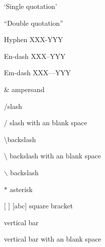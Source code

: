 \documentclass[12pt]{article}
\begin{document}
`Single quotation'

``Double quotation''

Hyphen XXX-YYY

En-dash XXX--YYY

Em-dash XXX---YYY

\& ampersand

\slash slash

\slash{} slash with an blank space

\textbackslash backslash

\textbackslash{} backslash with an blank space

$\backslash$ backslash

$\ast$ asterisk

{[} {]} {[abc]} square bracket

\textbar vertical bar

\textbar{} vertical bar with an blank space
\end{document}
